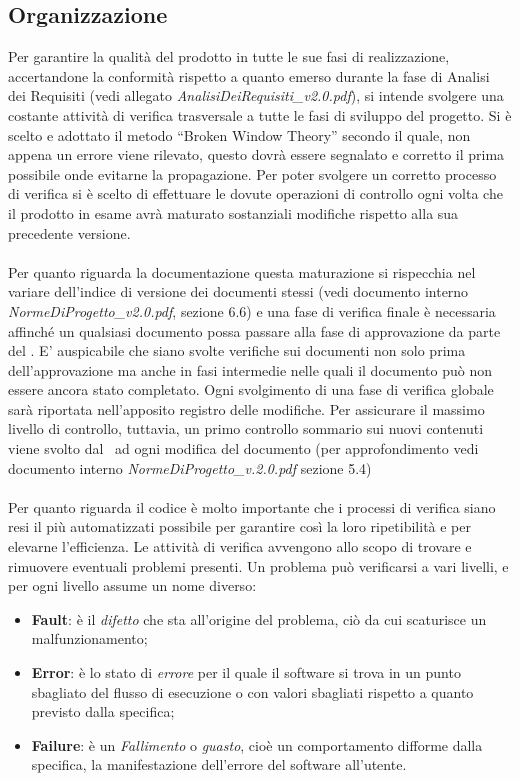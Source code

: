 \subsection{Organizzazione}

Per garantire la qualità del prodotto in tutte le sue fasi di realizzazione, accertandone la conformità rispetto a quanto emerso durante la fase di Analisi dei Requisiti (vedi allegato \textit{AnalisiDeiRequisiti\_v2.0.pdf}), si intende svolgere una costante attività di verifica trasversale a tutte le fasi di sviluppo del progetto. Si è scelto e adottato il metodo ``Broken Window Theory'' secondo il quale, non appena un errore viene rilevato, questo dovrà essere segnalato e corretto il prima possibile onde evitarne la propagazione. Per poter svolgere un corretto processo di verifica si è scelto di effettuare le dovute operazioni di controllo ogni volta che il prodotto in esame avrà maturato sostanziali modifiche rispetto alla sua precedente versione. \\ \\
Per quanto riguarda la documentazione questa maturazione si rispecchia nel variare dell'indice di versione dei documenti stessi (vedi documento interno \textit{NormeDiProgetto\_v2.0.pdf}, sezione 6.6) e una fase di verifica finale è necessaria affinché un qualsiasi documento possa passare alla fase di approvazione da parte del \ruoloResponsabile. E' auspicabile che siano svolte verifiche sui documenti non solo prima dell'approvazione ma anche in fasi intermedie nelle quali il documento può non essere ancora stato completato. Ogni svolgimento di una fase di verifica globale sarà riportata nell'apposito registro delle modifiche. Per assicurare il massimo livello di controllo, tuttavia, un primo controllo sommario sui nuovi contenuti viene svolto dal \ruoloVerificatore\ ad ogni modifica del documento (per approfondimento vedi documento interno \textit{NormeDiProgetto\_v.2.0.pdf} sezione 5.4)
\\ \\
 Per quanto riguarda il codice è molto importante che i processi di verifica siano resi il più automatizzati possibile per garantire così la loro ripetibilità e per elevarne l'efficienza. Le attività di verifica avvengono allo scopo di trovare e rimuovere eventuali problemi presenti. Un problema può verificarsi a vari livelli, e per ogni livello assume un nome diverso:
\begin{itemize}
	\item \textbf{Fault}: è il \textit{difetto} che sta all'origine del problema, ciò da cui scaturisce un malfunzionamento;
	\item \textbf{Error}: è lo stato di \textit{errore} per il quale il software si trova in un punto sbagliato del flusso di esecuzione o con valori sbagliati rispetto a quanto previsto dalla specifica;
	\item \textbf{Failure}: è un \textit{Fallimento} o \textit{guasto}, cioè un comportamento difforme dalla specifica, la manifestazione dell'errore del software all'utente.
\end{itemize}\\
